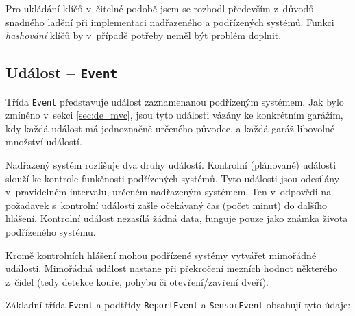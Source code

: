 Pro ukládání klíčů v~čitelné podobě jsem se rozhodl především z~důvodů snadného ladění při implementaci nadřazeného a podřízených systémů. Funkci \textit{hashování} klíčů by v~případě potřeby neměl být problém doplnit.



\subsection{Událost -- \texttt{Event}}

Třída \texttt{Event} představuje událost zaznamenanou podřízeným systémem. Jak bylo zmíněno v~sekci \ref{sec:de_mvc}, jsou tyto události vázány ke konkrétním garážím, kdy každá událost má jednoznačně určeného původce, a každá garáž libovolné množství událostí.

Nadřazený systém rozlišuje dva druhy událostí. Kontrolní (plánované) události slouží ke kontrole funkčnosti podřízených systémů. Tyto události jsou odesílány v~pravidelném intervalu, určeném nadřazeným systémem. Ten v~odpovědi na požadavek s~kontrolní událostí zašle očekávaný čas (počet minut) do dalšího hlášení. Kontrolní událost nezasílá žádná data, funguje pouze jako známka života podřízeného systému.

Kromě kontrolních hlášení mohou podřízené systémy vytvářet mimořádné události. Mimořádná událost nastane při překročení mezních hodnot některého z~čidel (tedy detekce kouře, pohybu či otevření/zavření dveří).

Základní třída \texttt{Event} a podtřídy \texttt{ReportEvent} a \texttt{SensorEvent} obsahují tyto údaje:

